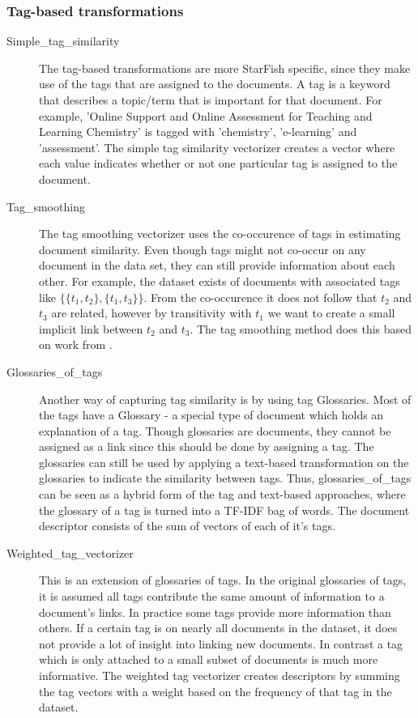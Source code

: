 \subsubsection{Tag-based transformations}
\begin{description}
\item[Simple\_tag\_similarity] The tag-based transformations are more StarFish specific, since they make use of the tags that are assigned to the documents. A tag is a keyword that describes a topic/term that is important for that document. For example, 'Online Support and Online Assessment for Teaching and Learning Chemistry' is tagged with 'chemistry', 'e-learning' and 'assessment'. The simple tag similarity vectorizer creates a vector where each value indicates whether or not one particular tag is assigned to the document. 

\item [Tag\_smoothing] The tag smoothing vectorizer uses the co-occurence of tags in estimating document similarity. Even though tags might not co-occur on any document in the data set, they can still provide information about each other. For example, the dataset exists of documents with associated tags like $\{\{t_1, t_2\}, \{t_1, t_3\}\}$. From the co-occurence it does not follow that $t_2$ and $t_3$ are related, however by transitivity with $t_1$ we want to create a small implicit link between $t_2$ and $t_3$. The tag smoothing method does this based on work from \citet{zhou2011web}.

\item [Glossaries\_of\_tags] Another way of capturing tag similarity is by using tag Glossaries. Most of the tags have a Glossary - a special type of document which holds an explanation of a tag. Though glossaries are documents, they cannot be assigned as a link since this should be done by assigning a tag. The glossaries can still be used by applying a text-based transformation on the glossaries to indicate the similarity between tags. Thus, glossaries\_of\_tags can be seen as a hybrid form of the tag and text-based approaches, where the glossary of a tag is turned into a TF-IDF bag of words. The document descriptor consists of the sum of vectors of each of it's tags. 

\item [Weighted\_tag\_vectorizer] This is an extension of glossaries of tags. In the original glossaries of tags, it is assumed all tags contribute the same amount of information to a document's links. In practice some tags provide more information than others. If a certain tag is on nearly all documents in the dataset, it does not provide a lot of insight into linking new documents. In contrast a tag which is only attached to a small subset of documents is much more informative. The weighted tag vectorizer creates descriptors by summing the tag vectors with a weight based on the frequency of that tag in the dataset.

\end{description}

